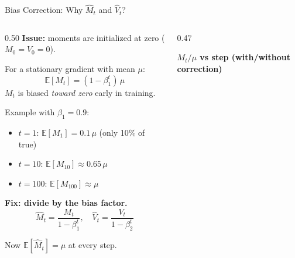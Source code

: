 \begin{frame}{Bias Correction: Why $\hat{M}_t$ and $\hat{V}_t$?}

  \begin{columns}[T]
    \begin{column}{0.50\textwidth}
      \textbf{Issue:} moments are initialized at zero ($M_0 = V_0 = 0$).

      \vspace{0.3em}
      For a stationary gradient with mean $\mu$:
      \[
        \mathbb{E}[M_t] = (1-\beta_1^t)\,\mu
      \]
      $M_t$ is biased \emph{toward zero} early in training.

      \vspace{0.3em}
      Example with $\beta_1 = 0.9$:
      \begin{itemize}
        \item $t=1$: $\mathbb{E}[M_1] = 0.1\,\mu$ (only 10\% of true)
        \item $t=10$: $\mathbb{E}[M_{10}] \approx 0.65\,\mu$
        \item $t=100$: $\mathbb{E}[M_{100}] \approx \mu$
      \end{itemize}

      \vspace{0.3em}
      \textbf{Fix: divide by the bias factor.}
      \[
        \hat{M}_t = \frac{M_t}{1-\beta_1^t}, \quad \hat{V}_t = \frac{V_t}{1-\beta_2^t}
      \]

      Now $\mathbb{E}[\hat{M}_t] = \mu$ at every step.
    \end{column}
    \begin{column}{0.47\textwidth}
      \begin{center}
      \textbf{$M_t/\mu$ vs step (with/without correction)}
      \vspace{0.3em}

\end{center}
\end{column}
\end{columns}
\end{frame}
